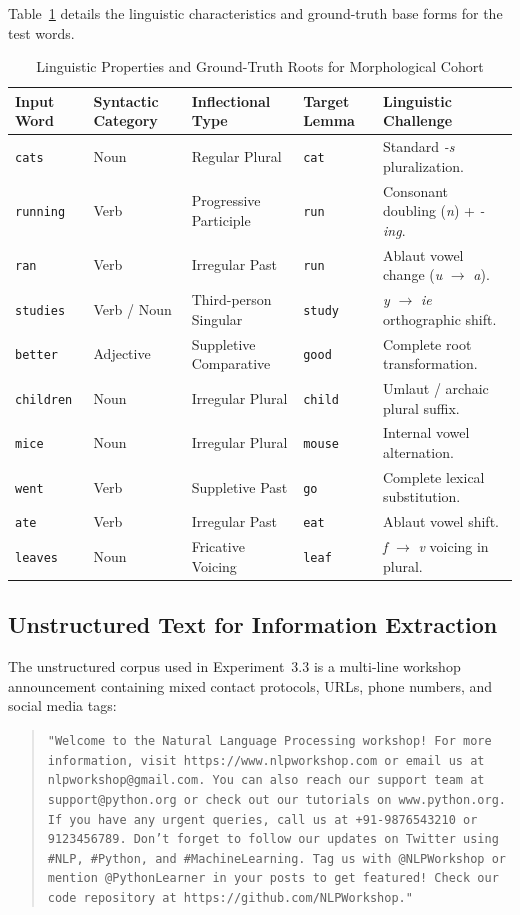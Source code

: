 Table~\ref{tab:exp3_morph_lexicon} details the linguistic characteristics and ground-truth base forms for the test words.
\begin{table}[H]
\centering
\small
\caption{Linguistic Properties and Ground-Truth Roots for Morphological Cohort}
\label{tab:exp3_morph_lexicon}
\begin{tabularx}{\textwidth}{llllX}
\toprule
\textbf{Input Word} & \textbf{Syntactic Category} & \textbf{Inflectional Type} & \textbf{Target Lemma} & \textbf{Linguistic Challenge} \\
\midrule
\texttt{cats} & Noun & Regular Plural & \texttt{cat} & Standard \textit{-s} pluralization. \\
\texttt{running} & Verb & Progressive Participle & \texttt{run} & Consonant doubling (\textit{n}) + \textit{-ing}. \\
\texttt{ran} & Verb & Irregular Past & \texttt{run} & Ablaut vowel change (\textit{u} $\to$ \textit{a}). \\
\texttt{studies} & Verb / Noun & Third-person Singular & \texttt{study} & \textit{y} $\to$ \textit{ie} orthographic shift. \\
\texttt{better} & Adjective & Suppletive Comparative & \texttt{good} & Complete root transformation. \\
\texttt{children} & Noun & Irregular Plural & \texttt{child} & Umlaut / archaic plural suffix. \\
\texttt{mice} & Noun & Irregular Plural & \texttt{mouse} & Internal vowel alternation. \\
\texttt{went} & Verb & Suppletive Past & \texttt{go} & Complete lexical substitution. \\
\texttt{ate} & Verb & Irregular Past & \texttt{eat} & Ablaut vowel shift. \\
\texttt{leaves} & Noun & Fricative Voicing & \texttt{leaf} & \textit{f} $\to$ \textit{v} voicing in plural. \\
\bottomrule
\end{tabularx}
\end{table}

\subsection{Unstructured Text for Information Extraction}
The unstructured corpus used in Experiment~3.3 is a multi-line workshop announcement containing mixed contact protocols, URLs, phone numbers, and social media tags:
\begin{quote}
\small
\texttt{"Welcome to the Natural Language Processing workshop! For more information, visit https://www.nlpworkshop.com or email us at nlpworkshop@gmail.com. You can also reach our support team at support@python.org or check out our tutorials on www.python.org. If you have any urgent queries, call us at +91-9876543210 or 9123456789. Don't forget to follow our updates on Twitter using \#NLP, \#Python, and \#MachineLearning. Tag us with @NLPWorkshop or mention @PythonLearner in your posts to get featured! Check our code repository at https://github.com/NLPWorkshop."}
\end{quote}

